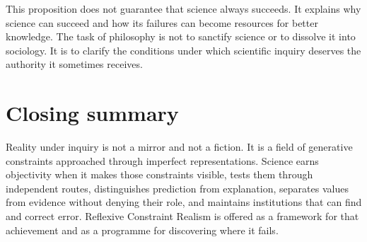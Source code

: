 This proposition does not guarantee that science always succeeds. It explains
why science can succeed and how its failures can become resources for better
knowledge. The task of philosophy is not to sanctify science or to dissolve it
into sociology. It is to clarify the conditions under which scientific inquiry
deserves the authority it sometimes receives.

\section*{Closing summary}

Reality under inquiry is not a mirror and not a fiction. It is a field of
generative constraints approached through imperfect representations. Science
earns objectivity when it makes those constraints visible, tests them through
independent routes, distinguishes prediction from explanation, separates
values from evidence without denying their role, and maintains institutions
that can find and correct error. Reflexive Constraint Realism is offered as a
framework for that achievement and as a programme for discovering where it
fails.

